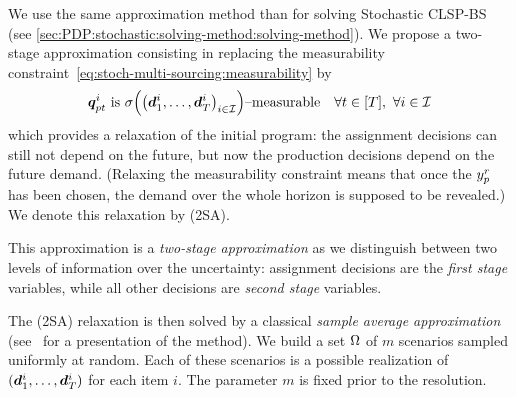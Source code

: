We use the same approximation method than for solving Stochastic CLSP-BS (see \cref{sec:PDP:stochastic:solving-method:solving-method}).
We propose a two-stage approximation consisting in replacing the measurability constraint~\eqref{eq:stoch-multi-sourcing:measurability} by
\begin{equation}
\va\quantity_{pt}^i\ \mbox{is}\ \Sfield{\bracket{\va\demand_1^i,\ldots,\va\demand_{\horizon}^i}_{i\in\REF}}\mbox{--measurable} \quad \forall t\in\range{\horizon},\ \forall i\in\REF
\end{equation}
which provides a relaxation of the initial program: the assignment decisions can still not depend on the future, but now the production decisions depend on the future demand.
(Relaxing the measurability constraint means that once the $y_p^r$ has been chosen, the demand over the whole horizon is supposed to be revealed.)
We denote this relaxation by (2SA).


This approximation is a \emph{two-stage approximation} as we distinguish between two levels of information over the uncertainty: assignment decisions are the \emph{first stage} variables, while all other decisions are \emph{second stage} variables.


The (2SA) relaxation is then solved by a classical {\em sample average approximation} (see~\citet{Kleywegt2002} for a presentation of the method).
We build a set $\Omega$ of $m$ scenarios sampled uniformly at random.
Each of these scenarios is a possible realization of $(\va\demand_1^i,\ldots,\va\demand_{\horizon}^i)$ for each item $i$.
The parameter $m$ is fixed prior to the resolution.


